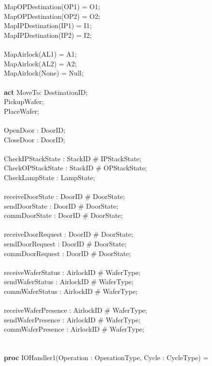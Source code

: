 \documentclass[a4paper,12pt]{article}
\begin{document}
\\
\\		MapOPDestination(OP1) = O1;
\\		MapOPDestination(OP2) = O2;
\\		MapIPDestination(IP1) = I1;
\\		MapIPDestination(IP2) = I2;
\\
\\		MapAirlock(AL1) = A1;
\\		MapAirlock(AL2) = A2;
\\		MapAirlock(None) = Null;
\\
\\\textbf{act} MoveTo: DestinationID;
\\	  PickupWafer;
\\	  PlaceWafer;
\\
\\	    OpenDoor : DoorID;
\\		CloseDoor : DoorID;
\\
\\	  CheckIPStackState : StackID \# IPStackState;
\\	  CheckOPStackState : StackID \# OPStackState;
\\		CheckLampState : LampState;
\\
\\	  receiveDoorState : DoorID \# DoorState;
\\	  sendDoorState : DoorID \# DoorState;
\\		commDoorState : DoorID \# DoorState;
\\
\\	  receiveDoorRequest : DoorID \# DoorState;
\\		sendDoorRequest : DoorID \# DoorState;
\\		commDoorRequest : DoorID \# DoorState;
\\
\\	  receiveWaferStatus : AirlockID \# WaferType;
\\		sendWaferStatus : AirlockID \# WaferType;
\\		commWaferStatus : AirlockID \# WaferType;
\\
\\	  receiveWaferPresence : AirlockID \# WaferType;
\\		sendWaferPresence : AirlockID \# WaferType;
\\		commWaferPresence : AirlockID \# WaferType;
\\
\\
\\\textbf{proc} IOHandler1(Operation : OperationType, Cycle : CycleType) = 
\end{document}
